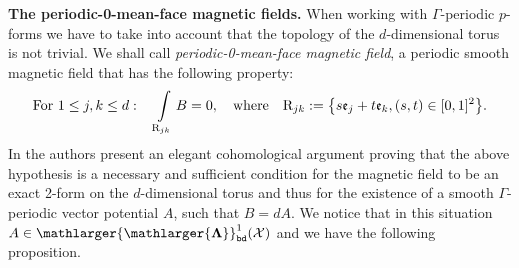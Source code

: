 \documentclass[12pt]{article}
\theoremstyle{definition}
\def\X{\mathcal X}
\def\beq{\begin{equation}}
\def\eeq{\end{equation}}
\def\Fb{\mathlarger{\mathlarger{\mathbf{\Lambda}}}_{\text{\tt bd}}}
\numberwithin{equation}{section}
\begin{document}
\noindent\textbf{The periodic-0-mean-face magnetic fields.}
When working with $\Gamma$-periodic $p$-forms we have to take into account that the topology of the $d$-dimensional torus is not trivial. We shall call \textit{periodic-0-mean-face magnetic field}, a periodic smooth magnetic field that  has  the following property:
\beq\label{H-Bper}
\text{For } 1\leq j,k\leq d:\quad\int\limits_{\text{\rm R}_{jk}}B=0,\quad\text{where}\quad\text{\rm R}_{jk}:=\big\{s\mathfrak{e}_j+t\mathfrak{e}_k,(s,t)\in[0,1]^2\big\}.
\eeq
In \cite{HH} the authors present an elegant cohomological argument proving that the above hypothesis is a necessary and sufficient condition for the magnetic field to be an exact 2-form on the $d$-dimensional torus and thus for the existence of a smooth $\Gamma$-periodic vector potential $A$, such that $B=dA$. We notice that in this situation $A\in\Fb^1(\X)$ and we have the following proposition.
\end{document}
